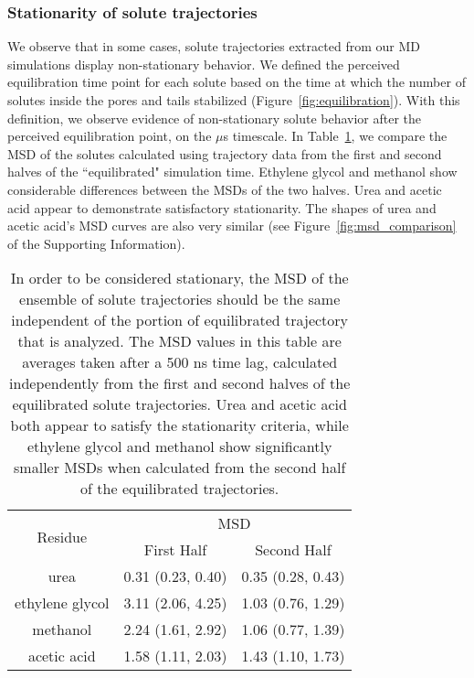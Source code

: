 \documentclass[journal=ancac3,manuscript=article,layout=twocolumn]{achemso}
\begin{document}
  
  \subsubsection{Stationarity of solute trajectories}\label{section:stationarity}
  
  We observe that in some cases, solute trajectories extracted from our MD
  simulations display non-stationary behavior. We defined the perceived
  equilibration time point for each solute based on the time at which the
  number of solutes inside the pores and tails stabilized
  (Figure~\ref{fig:equilibration}).  With this definition, we observe
  evidence of non-stationary solute behavior after the perceived equilibration
  point, on the $\mu$s timescale. In Table~\ref{table:stationarity}, we compare
  the MSD of the solutes calculated using trajectory data from the first and
  second halves of the ``equilibrated" simulation time. Ethylene glycol and
  methanol show considerable differences between the MSDs of the two halves.
  Urea and acetic acid appear to demonstrate satisfactory stationarity. The
  shapes of urea and acetic acid's MSD curves are also very similar (see
  Figure~\ref{fig:msd_comparison} of the Supporting Information).
  
  \begin{table}[h]
  \centering
  \begin{tabular}{|c|c|c|}
  \hline
  \multirow{2}{*}{Residue} & \multicolumn{2}{c|}{MSD}            \\\cline{2-3}
                           & First Half       & Second Half      \\\hline
  urea                     & 0.31 (0.23, 0.40)& 0.35 (0.28, 0.43)\\\hline
  ethylene glycol          & 3.11 (2.06, 4.25)& 1.03 (0.76, 1.29)\\\hline
  methanol                 & 2.24 (1.61, 2.92)& 1.06 (0.77, 1.39)\\\hline
  acetic acid              & 1.58 (1.11, 2.03)& 1.43 (1.10, 1.73)\\\hline

  \end{tabular}
  \caption{In order to be considered stationary, the MSD of the ensemble of
	  solute trajectories should be the same independent of the portion of
	  equilibrated trajectory that is analyzed. The MSD values in this
	  table are averages taken after a 500 ns time lag, calculated
	  independently from the first and second halves of the equilibrated
	  solute trajectories. Urea and acetic acid both appear to satisfy the
	  stationarity criteria, while ethylene glycol and methanol show
	  significantly smaller MSDs when calculated from the second half of
	  the equilibrated trajectories.}\label{table:stationarity}
  \end{table}
\end{document}
